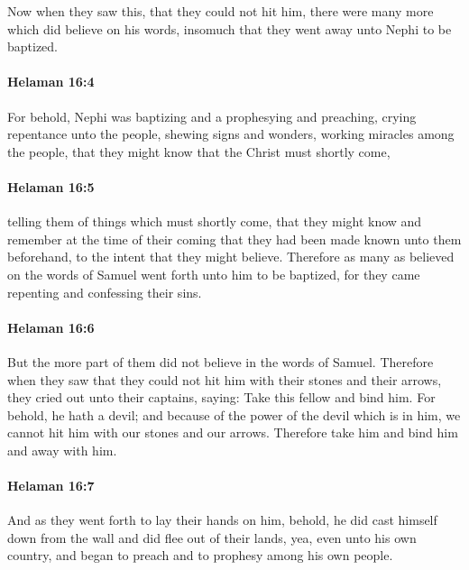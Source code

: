 			Now when they saw this, that they could not hit him,
			there were many more which did believe on his words,
			insomuch that they went away unto Nephi to be baptized.

		\paragraph{Helaman 16:4} %
			\label{HELAMAN-16-4}

			For behold, Nephi was baptizing and a prophesying and preaching,
			crying repentance unto the people,
			shewing signs and wonders,
			working miracles among the people,
			that they might know that the Christ must shortly come,

		\paragraph{Helaman 16:5} %
			\label{HELAMAN-16-5}

			telling them of things which must shortly come,
			that they might know and remember at the time of their coming
			that they had been made known unto them beforehand,
			to the intent that they might believe.
			Therefore as many as believed on the words of Samuel
			went forth unto him to be baptized,
			for they came repenting and confessing their sins.

		\paragraph{Helaman 16:6} %
			\label{HELAMAN-16-6}

			But the more part of them did not believe in the words of Samuel.
			Therefore when they saw that they could not hit him
			with their stones and their arrows,
			they cried out unto their captains, saying:
			Take this fellow and bind him.
			For behold, he hath a devil;
			and because of the power of the devil which is in him,
			we cannot hit him with our stones and our arrows.
			Therefore take him and bind him and away with him.

		\paragraph{Helaman 16:7} %
			\label{HELAMAN-16-7}

			And as they went forth to lay their hands on him,
			behold, he did cast himself down from the wall
			and did flee out of their lands,
			yea, even unto his own country,
			and began to preach and to prophesy among his own people.

